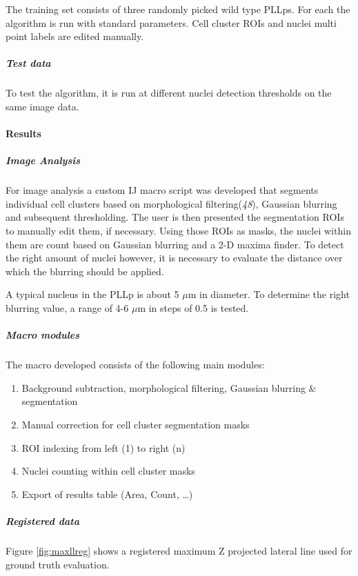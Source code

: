 \documentclass[11pt,singlespacinge,twoside]{reedthesis} %
\providecommand{\tightlist}{%
  \setlength{\itemsep}{0pt}\setlength{\parskip}{0pt}}
\def\labelenumi{\arabic{enumi}.}
\begin{document}
The training set consists of three randomly picked wild type PLLps. For each the algorithm is run with standard parameters. Cell cluster ROIs and nuclei multi point labels are edited manually.

\hypertarget{test-data}{%
\subparagraph{Test data}\label{test-data}}

To test the algorithm, it is run at different nuclei detection thresholds on the same image data.

\hypertarget{results}{%
\paragraph{Results}\label{results}}

\hypertarget{image-analysis}{%
\subparagraph{Image Analysis}\label{image-analysis}}

For image analysis a custom IJ macro script was developed that segments individual cell clusters based on morphological filtering(\emph{48}), Gaussian blurring and subsequent thresholding. The user is then presented the segmentation ROIs to manually edit them, if necessary. Using those ROIs as masks, the nuclei within them are count based on Gaussian blurring and a 2-D maxima finder. To detect the right amount of nuclei however, it is necessary to evaluate the distance over which the blurring should be applied.

A typical nucleus in the PLLp is about 5 \(\mu\)m in diameter. To determine the right blurring value, a range of 4-6 \(\mu\)m in steps of 0.5 is tested.

\hypertarget{macro-modules}{%
\subparagraph{Macro modules}\label{macro-modules}}

The macro developed consists of the following main modules:
\begin{enumerate}
\def\labelenumi{\arabic{enumi}.}
\tightlist
\item
  Background subtraction, morphological filtering, Gaussian blurring \& segmentation
\item
  Manual correction for cell cluster segmentation masks
\item
  ROI indexing from left (1) to right (n)
\item
  Nuclei counting within cell cluster masks
\item
  Export of results table (Area, Count, \ldots{})
\end{enumerate}
\hypertarget{registered-data}{%
\subparagraph{Registered data}\label{registered-data}}

Figure \ref{fig:maxllreg} shows a registered maximum Z projected lateral line used for ground truth evaluation.
\end{document}
